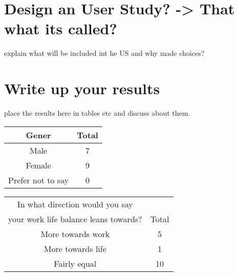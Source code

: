 \documentclass{sigchi}
\begin{document}


\section{Design an User Study? -> That what its called?}
	explain what will be included int he US and why made choices?


	


\section{Write up your results}
	place the results here in tables etc and discuss about them.
	
	\begin{center}
		\begin{tabular}{ |c| c | }
			\hline
			Gener & Total  \\ 
			\hline
			Male & 7 \\ 
			\hline
			Female & 9  \\ 
			\hline
			Prefer not to say &  0\\
			\hline
			
		\end{tabular}
	\end{center}

	\begin{center}
		\begin{tabular}{ |c| c | }
			\hline
			In what direction would you say & \\
			your work life balance leans towards? & Total  \\ 
			\hline
			More towards work & 5 \\ 
			\hline
			More towards life & 1  \\ 
			\hline
			Fairly equal &  10 \\
			\hline
			
		\end{tabular}
	\end{center}
\end{document}
